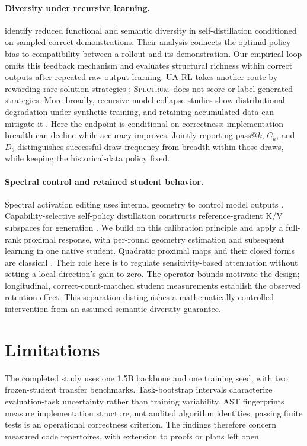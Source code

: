 \documentclass{article}
\newcommand{\method}{\textsc{Spectrum}}
\begin{document}
\paragraph{Diversity under recursive learning.}
\citet{nicolicioiu2026diversity} identify reduced functional and semantic diversity in self-distillation conditioned on sampled correct demonstrations. Their analysis connects the optimal-policy bias to compatibility between a rollout and its demonstration. Our empirical loop omits this feedback mechanism and evaluates structural richness within correct outputs after repeated raw-output learning. UA-RL takes another route by rewarding rare solution strategies \citep{hu2026uarlacl}; \method\ does not score or label generated strategies. More broadly, recursive model-collapse studies show distributional degradation under synthetic training, and retaining accumulated data can mitigate it \citep{shumailov2024collapse,gerstgrasser2024accumulating}. Here the endpoint is conditional on correctness: implementation breadth can decline while accuracy improves. Jointly reporting pass@$k$, $C_k$, and $D_b$ distinguishes successful-draw frequency from breadth within those draws, while keeping the historical-data policy fixed.

\paragraph{Spectral control and retained student behavior.}
Spectral activation editing uses internal geometry to control model outputs \citep{qiu2024sea}. Capability-selective self-policy distillation constructs reference-gradient K/V subspaces for generation \citep{hao2026spd}. We build on this calibration principle and apply a full-rank proximal response, with per-round geometry estimation and subsequent learning in one native student. Quadratic proximal maps and their closed forms are classical \citep{parikh2014proximal}. Their role here is to regulate sensitivity-based attenuation without setting a local direction's gain to zero. The operator bounds motivate the design; longitudinal, correct-count-matched student measurements establish the observed retention effect. This separation distinguishes a mathematically controlled intervention from an assumed semantic-diversity guarantee.

\section{Limitations}
\label{sec:limitations}
The completed study uses one 1.5B backbone and one training seed, with two frozen-student transfer benchmarks. Task-bootstrap intervals characterize evaluation-task uncertainty rather than training variability. AST fingerprints measure implementation structure, not audited algorithm identities; passing finite tests is an operational correctness criterion. The findings therefore concern measured code repertoires, with extension to proofs or plans left open.
\end{document}
